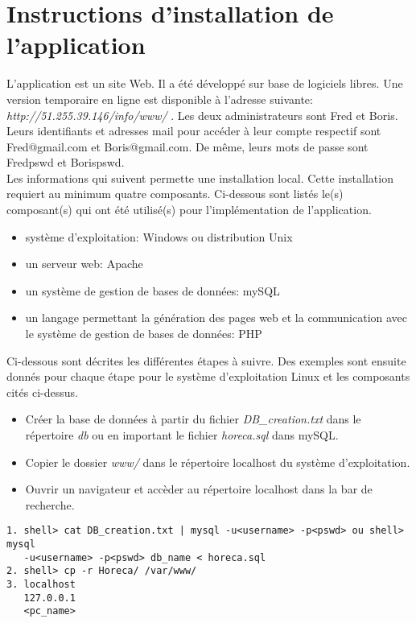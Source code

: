 \section{Instructions d'installation de l'application}
\noindent L'application est un site Web. Il a été développé sur base de logiciels libres. Une version temporaire en ligne est disponible à l'adresse suivante: \textit{http://51.255.39.146/info/www/} . Les deux administrateurs sont Fred et Boris. Leurs identifiants et adresses mail pour accéder à leur compte respectif sont Fred@gmail.com et Boris@gmail.com. De même, leurs mots de passe sont Fredpswd et Borispswd.\\
Les informations qui suivent permette une installation local. Cette installation requiert au minimum quatre composants. Ci-dessous sont listés le(s) composant(s) qui ont été utilisé(s) pour l'implémentation de l'application.
\begin{itemize}
    \item système d'exploitation: Windows ou distribution Unix
    \item un serveur web: Apache
    \item un système de gestion de bases de données: mySQL
    \item un langage permettant la génération des pages web et la communication avec le système de gestion de bases de données: PHP
\end{itemize}

\noindent Ci-dessous sont décrites les différentes étapes à suivre. Des exemples sont ensuite donnés pour chaque étape pour le système d'exploitation Linux et les composants cités ci-dessus.
\begin{itemize}
    \item Créer la base de données à partir du fichier \textit{DB\_creation.txt} dans le répertoire \textit{db} ou en important le fichier \textit{horeca.sql} dans mySQL.
    \item Copier le dossier \textit{www/} dans le répertoire localhost du système d'exploitation.
    \item Ouvrir un navigateur et accèder au répertoire localhost dans la bar de recherche.
\end{itemize}

\begin{verbatim}
1. shell> cat DB_creation.txt | mysql -u<username> -p<pswd> ou shell> mysql
   -u<username> -p<pswd> db_name < horeca.sql
2. shell> cp -r Horeca/ /var/www/
3. localhost
   127.0.0.1
   <pc_name>
    
\end{verbatim}